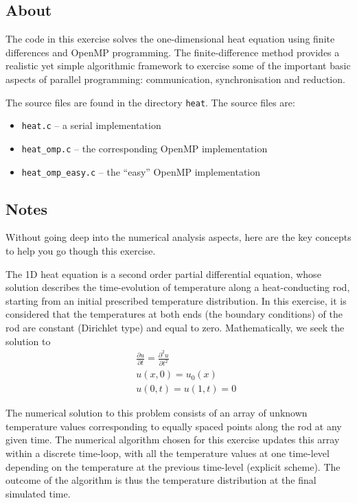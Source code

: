 \documentclass[a4paper, 12pt]{article}
\def \cc   {\tt }               %
\begin{document}
\subsection*{About}

The code in this exercise solves the one-dimensional heat equation
using finite differences and OpenMP programming.  The
finite-difference method provides a realistic yet simple algorithmic
framework to exercise some of the important basic aspects of parallel
programming: communication, synchronisation and reduction.

The source files are found in the directory {\cc heat}.  The source files are:
%
\begin{itemize}
  \item {\cc heat.c} -- a serial implementation
  \item {\cc heat\_omp.c} -- the corresponding OpenMP implementation
  \item {\cc heat\_omp\_easy.c} -- the ``easy'' OpenMP implementation
\end{itemize}


\subsection*{Notes}

Without going deep into the numerical analysis aspects, here are the
key concepts to help you go though this exercise.

The 1D heat equation is a second order partial differential equation,
whose solution describes the time-evolution of temperature along a
heat-conducting rod, starting from an initial prescribed temperature
distribution.  In this exercise, it is considered that the
temperatures at both ends (the boundary conditions) of the rod are
constant (Dirichlet type) and equal to zero.  Mathematically, we seek
the solution to
%
\begin{eqnarray}
  && \frac{\partial u}{\partial t} = \frac{\partial^2 u}{\partial t^2} \\
  && u(x, 0) = u_0(x) \\
  && u(0, t) = u(1, t) = 0
\end{eqnarray}

The numerical solution to this problem consists of an array of unknown
temperature values corresponding to equally spaced points along the
rod at any given time.  The numerical algorithm chosen for this
exercise updates this array within a discrete time-loop, with all the
temperature values at one time-level depending on the temperature at
the previous time-level (explicit scheme).  The outcome of the
algorithm is thus the temperature distribution at the final simulated
time.
\end{document}
